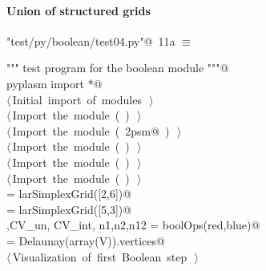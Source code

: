 \documentclass[11pt,oneside]{article}	%
\begin{document}
\paragraph{Union of structured grids}

\begin{flushleft} \small
\begin{minipage}{\linewidth} \label{scrap24}
\protect{}\verb@"test/py/boolean/test04.py"@\nobreak\ {\footnotesize 11a }$\equiv$
\vspace{-1ex}
\begin{list}{}{} \item
\mbox{}\verb@""" test program for the boolean module """@\\
\mbox{}\verb@from pyplasm import *@\\
\mbox{}\verb@@\hbox{$\langle\,$Initial import of modules\nobreak\ {\footnotesize {}}$\,\rangle$}\verb@@\\
\mbox{}\verb@@\hbox{$\langle\,$Import the module\nobreak\ ({\footnotesize {}\label{scrap25}
 }\mbox{}\verb@boolean@ ) {\footnotesize {}}$\,\rangle$}\verb@@\\
\mbox{}\verb@@\hbox{$\langle\,$Import the module\nobreak\ ({\footnotesize {}\label{scrap26}
 }\mbox{}\verb@lar2psm@ ) {\footnotesize {}}$\,\rangle$}\verb@@\\
\mbox{}\verb@@\hbox{$\langle\,$Import the module\nobreak\ ({\footnotesize {}\label{scrap27}
 }\mbox{}\verb@simplexn@ ) {\footnotesize {}}$\,\rangle$}\verb@@\\
\mbox{}\verb@@\hbox{$\langle\,$Import the module\nobreak\ ({\footnotesize {}\label{scrap28}
 }\mbox{}\verb@larcc@ ) {\footnotesize {}}$\,\rangle$}\verb@@\\
\mbox{}\verb@@\hbox{$\langle\,$Import the module\nobreak\ ({\footnotesize {}\label{scrap29}
 }\mbox{}\verb@largrid@ ) {\footnotesize {}}$\,\rangle$}\verb@@\\
\mbox{}\verb@blue = larSimplexGrid([2,6])@\\
\mbox{}\verb@red = larSimplexGrid([5,3])@\\
\mbox{}\verb@V,CV_un, CV_int, n1,n2,n12 = boolOps(red,blue)@\\
\mbox{}\verb@CV = Delaunay(array(V)).vertices@\\
\mbox{}\verb@@\hbox{$\langle\,$Visualization of first Boolean step\nobreak\ {\footnotesize {}}$\,\rangle$}\verb@@\\
\mbox{}\verb@@{\NWsep}
\end{list}
\vspace{-2ex}
\end{minipage}\\[4ex]
\end{flushleft}
\end{document}
